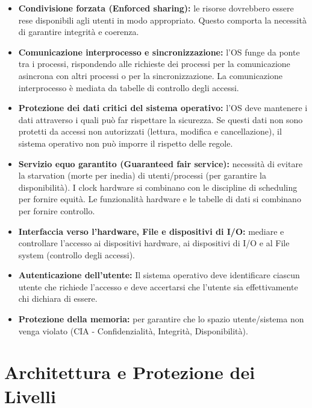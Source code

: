 \documentclass{article}
\begin{document}
\begin{itemize}
    \item \textbf{Condivisione forzata (Enforced sharing):} le risorse dovrebbero essere rese disponibili agli utenti in modo appropriato. Questo comporta la necessità di garantire integrità e coerenza.
    \item \textbf{Comunicazione interprocesso e sincronizzazione:} l'OS funge da ponte tra i processi, rispondendo alle richieste dei processi per la comunicazione asincrona con altri processi o per la sincronizzazione. La comunicazione interprocesso è mediata da tabelle di controllo degli accessi.
    \item \textbf{Protezione dei dati critici del sistema operativo:} l'OS deve mantenere i dati attraverso i quali può far rispettare la sicurezza. Se questi dati non sono protetti da accessi non autorizzati (lettura, modifica e cancellazione), il sistema operativo non può imporre il rispetto delle regole.
    \item \textbf{Servizio equo garantito (Guaranteed fair service):} necessità di evitare la starvation (morte per inedia) di utenti/processi (per garantire la disponibilità). I clock hardware si combinano con le discipline di scheduling per fornire equità. Le funzionalità hardware e le tabelle di dati si combinano per fornire controllo.
    \item \textbf{Interfaccia verso l'hardware, File e dispositivi di I/O:} mediare e controllare l'accesso ai dispositivi hardware, ai dispositivi di I/O e al File system (controllo degli accessi).
    \item \textbf{Autenticazione dell'utente:} Il sistema operativo deve identificare ciascun utente che richiede l'accesso e deve accertarsi che l'utente sia effettivamente chi dichiara di essere.
    \item \textbf{Protezione della memoria:} per garantire che lo spazio utente/sistema non venga violato (CIA - Confidenzialità, Integrità, Disponibilità).
\end{itemize}

\vspace{0.8cm}

\section*{Architettura e Protezione dei Livelli}
\end{document}
